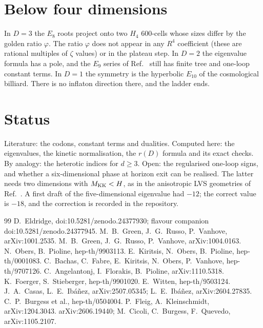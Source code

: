 \documentclass[aps,prd,twocolumn,superscriptaddress,nofootinbib,showkeys]{revtex4-2}
\begin{document}
\section{Below four dimensions}
In $D=3$ the $E_8$ roots project onto two $H_4$ 600-cells whose sizes differ by the golden ratio $\varphi$. The ratio $\varphi$ does not appear in any $R^4$ coefficient (these are rational multiples of $\zeta$ values) or in the plateau step. In $D=2$ the eigenvalue formula has a pole, and the $E_9$ series of Ref.~\cite{FK} still has finite tree and one-loop constant terms. In $D=1$ the symmetry is the hyperbolic $E_{10}$ of the cosmological billiard. There is no inflaton direction there, and the ladder ends.

\section{Status}
Literature: the codons, constant terms and dualities. Computed here: the eigenvalues, the kinetic normalisation, the $r(D)$ formula and its exact checks. By analogy: the heterotic indices for $d\ge3$. Open: the regularised one-loop signs, and whether a six-dimensional phase at horizon exit can be realised. The latter needs two dimensions with $M_{\rm KK}<H$, as in the anisotropic LVS geometries of Ref.~\cite{ADD}. A first draft of the five-dimensional eigenvalue had $-12$; the correct value is $-18$, and the correction is recorded in the repository.

\begin{thebibliography}{99}
 D.~Eldridge, doi:10.5281/zenodo.24377930; flavour companion doi:10.5281/zenodo.24377945.
 M.~B.~Green, J.~G.~Russo, P.~Vanhove, arXiv:1001.2535.
 M.~B.~Green, J.~G.~Russo, P.~Vanhove, arXiv:1004.0163.
 N.~Obers, B.~Pioline, hep-th/9903113.
 E.~Kiritsis, N.~Obers, B.~Pioline, hep-th/0001083.
 C.~Bachas, C.~Fabre, E.~Kiritsis, N.~Obers, P.~Vanhove, hep-th/9707126.
 C.~Angelantonj, I.~Florakis, B.~Pioline, arXiv:1110.5318.
 K.~Foerger, S.~Stieberger, hep-th/9901020.
 E.~Witten, hep-th/9503124.
 J.~A.~Casas, L.~E.~Ib\'a\~nez, arXiv:2507.05345; L.~E.~Ib\'a\~nez, arXiv:2604.27835.
 C.~P.~Burgess et al., hep-th/0504004.
 P.~Fleig, A.~Kleinschmidt, arXiv:1204.3043.
 arXiv:2606.19440; M.~Cicoli, C.~Burgess, F.~Quevedo, arXiv:1105.2107.
\end{thebibliography}
\end{document}
